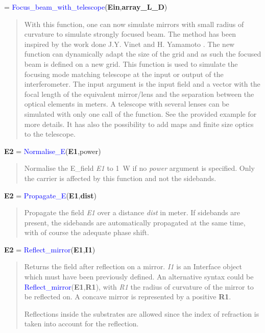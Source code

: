  = \textcolor{blue}{Focus\_beam\_with\_telescope}(\textbf{Ein},\textbf{array\_L\_D})
\vspace*{-0.2cm}
\begin{quote}
With this function, one can now simulate mirrors with small radius of curvature to simulate strongly focused beam. The method has been inspired by the work done J.Y. Vinet \cite{Virgo_PB} and H. Yamamoto \cite{Hiro1}.
The new function can dynamically adapt the size of the grid and as such the focused beam is defined on a new grid. This function is used to simulate the focusing mode matching telescope at the input or output of the interferometer.
The input argument is the input field and a vector with the focal length of the equivalent mirror/lens and the separation between the optical elements in meters. A telescope with several lenses can be simulated with only one call of the function.
See the provided example for more details.
It has also the possibility to add maps and finite size optics to the telescope.
\end{quote}

\noindent \textbf{E2} = \textcolor{blue}{Normalise\_E}(\textbf{E1},power)
\vspace*{-0.2cm}
\begin{quote}
Normalise the E\_field \textsl{E1} to 1~W if no \textsl{power} argument is specified. Only the carrier is affected by this function and not the sidebands.
\end{quote}

\noindent \textbf{E2} = \textcolor{blue}{Propagate\_E}(\textbf{E1},\textbf{dist})
\vspace*{-0.2cm}
\begin{quote}
Propagate the field \textsl{E1} over a distance \textsl{dist} in meter. If sidebands are present, the sidebands are automatically propagated at the same time, with of course the adequate phase shift.
\end{quote}

\noindent \textbf{E2} = \textcolor{blue}{Reflect\_mirror}(\textbf{E1},\textbf{I1})
\vspace*{-0.2cm}
\begin{quote}
Returns the field after reflection on a mirror. \textsl{I1} is an Interface object which must have been previously defined. An alternative syntax could be \textcolor{blue}{Reflect\_mirror}(\textbf{E1},\textbf{R1}), with \textsl{R1} the radius of curvature of the mirror to be reflected on. A concave mirror is represented by a positive \textbf{R1}.

Reflections inside the substrates are allowed since the index of refraction is taken into account for the reflection.
\end{quote}


